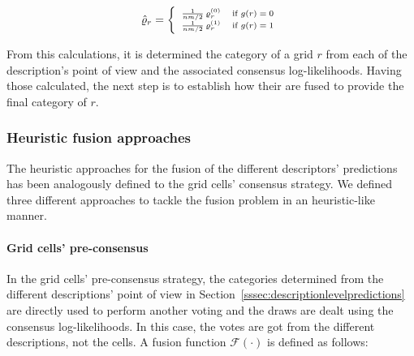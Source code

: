 \documentclass[10pt,twocolumn,letterpaper]{article}
\begin{document}
\begin{gather*}\scriptsize
\hat{\varrho}_r =
\left\{
	\begin{array}{ll}
		\frac{1}{nm / 2} \, \varrho_{r}^{(0)}  & \mbox{if }  g(r) = 0  \\
		\frac{1}{nm / 2} \, \varrho_{r}^{(1)} & \mbox{if }  g(r) = 1
	\end{array}
\right.
\end{gather*}

From this calculations, it is determined the category of a grid $r$ from each of the description's point of view and the associated consensus log-likelihoods. Having those calculated, the next step is to establish how their are fused to provide the final category of $r$.

\subsubsection{Heuristic fusion approaches}

The heuristic approaches for the fusion of the different descriptors' predictions has been analogously defined to the grid cells' consensus strategy. We defined three different approaches to tackle the fusion problem in an heuristic-like manner.

\paragraph{Grid cells' pre-consensus}

In the grid cells' pre-consensus strategy, the categories determined from the different descriptions' point of view in Section~\ref{sssec:descriptionlevelpredictions} are directly used to perform another voting and the draws are dealt using the consensus log-likelihoods. In this case, the votes are got from the different descriptions, not the cells. A fusion function $\mathcal{F}(\cdot)$ is defined as follows:
\end{document}
